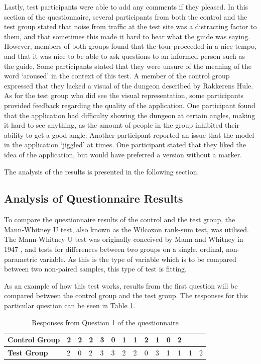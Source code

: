 Lastly, test participants were able to add any comments if they pleased. In this section of the questionnaire, several participants from both the control and the test group stated that noise from traffic at the test site was a distracting factor to them, and that sometimes this made it hard to hear what the guide was saying. However, members of both groups found that the tour proceeded in a nice tempo, and that it was nice to be able to ask questions to an informed person such as the guide. Some participants stated that they were unsure of the meaning of the word ‘aroused’ in the context of this test. A member of the control group expressed that they lacked a visual of the dungeon described by Rakkerens Hule. As for the test group who did see the visual representation, some participants provided feedback regarding the quality of the application. One participant found that the application had difficulty showing the dungeon at certain angles, making it hard to see anything, as the amount of people in the group inhibited their ability to get a good angle. Another participant reported an issue that the model in the application ‘jiggled’ at times. One participant stated that they liked the idea of the application, but would have preferred a version without a marker.
 
The analysis of the results is presented in the following section.

\subsection{Analysis of Questionnaire Results}\label{sec:questionnaire_analysis}
To compare the questionnaire results of the control and the test group, the Mann-Whitney U test, also known as the Wilcoxon rank-sum test, was utilised. The Mann-Whitney U test was originally conceived by Mann and Whitney in 1947 \cite{Mann1947}, and tests for differences between two groups on a single, ordinal, non-parametric variable. As this is the type of variable which is to be compared between two non-paired samples, this type of test is fitting.

As an example of how this test works, results from the first question will be compared between the control group and the test group. The responses for this particular question can be seen in Table \ref{table:question_1}.

\begin{table}[h!]\centering
\begin{tabular}{| p{1.5cm} | p{0.2cm} | p{0.2cm} | p{0.2cm} | p{0.2cm} | p{0.2cm} | p{0.2cm} | p{0.2cm} | p{0.2cm} | p{0.2cm} | p{0.2cm} | p{0.2cm} | p{0.2cm} | p{0.2cm} |}\hline
\textbf{Control Group} & 2 & 2 & 2 & 3 & 0 & 1 & 1 & 2 & 1 & 0 & 2 &  &  \\ \hline
\textbf{Test Group} & 2 & 0 & 2 & 3 & 3 & 2 & 2 & 0 & 3 & 1 & 1 & 1 &2 \\ \hline
\end{tabular}
\caption{Responses from Question 1 of the questionnaire \label{table:question_1}}
\end{table}


